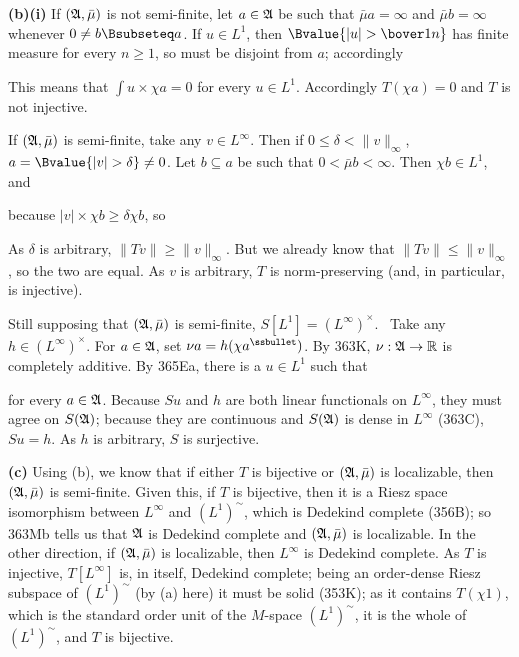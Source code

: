 {{\bf (b)(i)}  If $(\frak A,\bar\mu)$ is not semi-finite, let
$a\in\frak A$ be such that $\bar\mu a=\infty$ and $\bar\mu b=\infty$
whenever $0\ne b\Bsubseteq a$.   If $u\in L^1$, then
$\Bvalue{|u|>\bover1n}$ has finite
measure for every $n\ge 1$, so must be disjoint from $a$;  accordingly
     
     
\noindent This means that $\int u\times\chi a=0$ for every $u\in L^1$.
Accordingly $T(\chi a)=0$ and $T$ is not injective.
     
\medskip
     
 If $(\frak A,\bar\mu)$ is semi-finite, take any $v\in
L^{\infty}$.   Then if $0\le\delta<\|v\|_{\infty}$,
$a=\Bvalue{|v|>\delta}\ne 0$.   Let $b\subseteq a$ be such that
$0<\bar\mu b<\infty$.   Then $\chi b\in L^1$, and
     
     
\noindent because $|v|\times\chi b\ge\delta\chi b$, so
     
     
\noindent   As $\delta$ is arbitrary, $\|Tv\|\ge\|v\|_{\infty}$.   But
we already know that $\|Tv\|\le\|v\|_{\infty}$, so the two are equal.
As $v$ is arbitrary, $T$ is norm-preserving (and, in particular, is
injective).
     
\medskip
     
 Still supposing that $(\frak A,\bar\mu)$ is
semi-finite, $S[L^1]=(L^{\infty})^{\times}$.
\Prf\ Take any $h\in(L^{\infty})^{\times}$.    For $a\in\frak A$, set
$\nu a=h(\chi a^{\ssbullet})$.   By 363K, $\nu:\frak A\to\Bbb R$
is completely additive.   By 365Ea, there is a $u\in L^1$ such that
     
     
\noindent for every $a\in\frak A$.   Because $Su$ and $h$ are both
linear functionals on $L^{\infty}$, they must agree on $S(\frak A)$;
because they are continuous and $S(\frak A)$ is dense in $L^{\infty}$
(363C), $Su=h$.   As $h$ is arbitrary, $S$ is surjective.\ \Qed
     
\medskip
     
{\bf (c)} Using (b), we know that if either $T$ is bijective or
$(\frak A,\bar\mu)$ is localizable, then $(\frak A,\bar\mu)$ is
semi-finite.   Given this, if $T$
is bijective, then it is a Riesz space isomorphism between $L^{\infty}$
and $(L^1)^{\sim}$, which is Dedekind complete (356B);  so 363Mb tells
us that $\frak A$ is Dedekind complete and $(\frak A,\bar\mu)$ is
localizable.   In the other direction, if $(\frak A,\bar\mu)$ is
localizable, then $L^{\infty}$ is Dedekind complete.   As $T$ is
injective, $T[L^{\infty}]$ is, in itself, Dedekind complete;  being an
order-dense Riesz subspace of $(L^1)^{\sim}$ (by (a) here) it must be
solid (353K);  as it contains $T(\chi 1)$, which is the standard order
unit of the $M$-space $(L^1)^{\sim}$, it is the whole of $(L^1)^{\sim}$,
and $T$ is bijective.
}%
     
